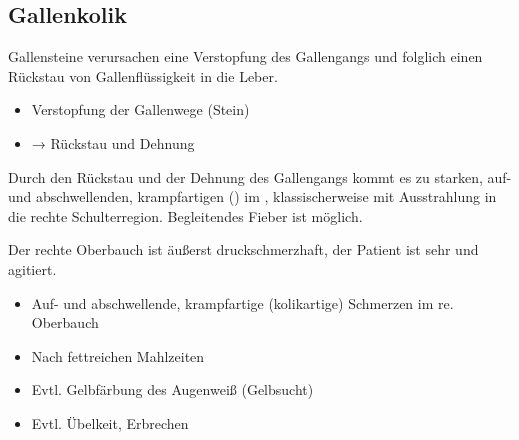\subsection{Gallenkolik}
\label{topic:gallenkolik}



{Gallensteine verursachen eine Verstopfung des
Gallengangs und folglich einen Rückstau von
Gallenflüssigkeit in die Leber.
} 
{
\begin{itemize}
  \item Verstopfung der Gallenwege (Stein)
  \item → Rückstau und Dehnung
\end{itemize}
}{}{}{}

{%
Durch den Rückstau und der Dehnung des Gallengangs kommt es
zu starken, auf- und abschwellenden, krampfartigen
()  im , klassischerweise mit Ausstrahlung in die rechte
Schulterregion. Begleitendes Fieber ist möglich.

Der rechte Oberbauch ist äußerst druckschmerzhaft, der
Patient ist sehr  und agitiert.

\bigskip

\bigskip

\bigskip
\bigskip
}{
\begin{itemize}
  \item Auf- und abschwellende, krampfartige
  (kolikartige) Schmerzen im re. Oberbauch
  \item Nach fettreichen Mahlzeiten
  \item Evtl. Gelbfärbung des Augenweiß (Gelbsucht)
  \item Evtl. Übelkeit, Erbrechen
\end{itemize}
}{}{}{}

% 
% 


